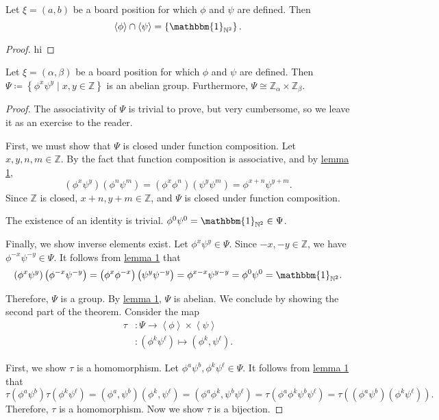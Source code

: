 \documentclass[11pt, letterpaper]{article}
\begin{document}
\begin{lemma}\label{lma:3}
	Let $\xi =(a,b)$ be a board position for which $\phi $ and $\psi $ are defined. Then
	\[
		\left<\phi  \right>\cap \left<\psi  \right> =\left\{ \mathbbm{1}_{\mathbb{N}^2} \right\} 
	.\]
\end{lemma}
\begin{proof}
	hi
\end{proof}
\begin{theorem}\label{thm:1}
	Let $\xi =(\alpha ,\beta )$ be a board position for which $\phi $ and $\psi $ are defined. Then $\Psi  \coloneqq \left\{ \phi ^x\psi ^y \mid x,y\in\mathbb{Z}  \right\} $ is an abelian group. Furthermore, $\Psi \cong \mathbb{Z}_\alpha \times \mathbb{Z}_\beta $.
\end{theorem}
\begin{proof}
	The associativity of $\Psi $ is trivial to prove, but very cumbersome, so we leave it as an exercise to the reader.

	First, we must show that $\Psi $ is closed under function composition. Let $x,y,n,m\in\mathbb{Z}$. By the fact that function composition is associative, and by \hyperref[lma:1]{lemma 1},
	\[
		\left( \phi ^x\psi ^y \right) \left( \phi ^n\psi ^m \right) =\left( \phi ^x\phi ^n \right) \left( \psi ^y\psi ^m \right) =\phi ^{x+n}\psi ^{y+m}
	.\]
	Since $\mathbb{Z}$ is closed, $x+n,y+m\in\mathbb{Z}$, and $\Psi $ is closed under function composition.

	The existence of an identity is trivial. $\phi ^0\psi ^0=\mathbbm{1}_{\mathbb{N}^2}\in \Psi $.

	Finally, we show inverse elements exist. Let $\phi^x\psi^y\in\Psi $. Since $-x,-y\in\mathbb{Z}$, we have $\phi ^{-x}\psi ^{-y}\in\Psi $. It follows from \hyperref[lma:1]{lemma 1} that
	\[
		\left( \phi ^x\psi ^y \right) \left( \phi ^{-x}\psi ^{-y} \right) =\left( \phi ^x\phi ^{-x} \right) \left( \psi ^y\psi ^{-y} \right) =\phi ^{x-x}\psi ^{y-y}=\phi ^0\psi ^0=\mathbbm{1}_{\mathbb{N}^2}
	.\]
	
	Therefore, $\Psi $ is a group. By \hyperref[lma:1]{lemma 1}, $\Psi $ is abelian. We conclude by showing the second part of the theorem. Consider the map
	\begin{align*}
		\tau &: \Psi  \to \left<\phi  \right>\times \left<\psi  \right>\\
		&: \left(  \phi^k\psi ^\ell\right)  \mapsto \left( \phi ^k,\psi ^\ell  \right) 
	.\end{align*}

	First, we show $\tau $ is a homomorphism. Let $\phi^a\psi ^b,\phi ^k\psi ^\ell \in\Psi $. It follows from \hyperref[lma:1]{lemma 1} that
	\[
		\tau \left( \phi ^a\psi ^b \right) \tau \left( \phi ^k\psi ^\ell  \right) =\left( \phi ^a,\psi ^b\right)\left( \phi ^k,\psi ^\ell  \right) =\left( \phi ^a\phi ^k,\psi ^b\psi ^\ell  \right) =\tau \left( \phi ^a\phi ^k\psi ^b\psi ^\ell  \right) =\tau \left( \left( \phi ^a\psi ^b \right) \left( \phi ^k\psi ^\ell  \right)  \right) 
	.\]
	Therefore, $\tau $ is a homomorphism. Now we show $\tau $ is a bijection.


\end{proof}
\end{document}
